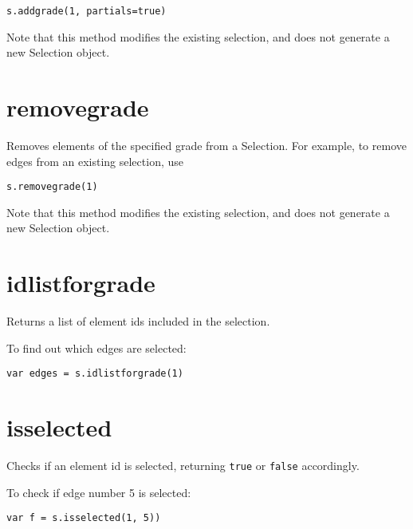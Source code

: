 \begin{lstlisting}
s.addgrade(1, partials=true)
\end{lstlisting}

Note that this method modifies the existing selection, and does not
generate a new Selection object.

\hypertarget{removegrade}{%
\section{removegrade}\label{removegrade}}

Removes elements of the specified grade from a Selection. For example,
to remove edges from an existing selection, use

\begin{lstlisting}
s.removegrade(1)
\end{lstlisting}

Note that this method modifies the existing selection, and does not
generate a new Selection object.

\hypertarget{idlistforgrade}{%
\section{idlistforgrade}\label{idlistforgrade}}

Returns a list of element ids included in the selection.

To find out which edges are selected:

\begin{lstlisting}
var edges = s.idlistforgrade(1)
\end{lstlisting}

\hypertarget{isselected}{%
\section{isselected}\label{isselected}}

Checks if an element id is selected, returning \texttt{true} or
\texttt{false} accordingly.

To check if edge number 5 is selected:

\begin{lstlisting}
var f = s.isselected(1, 5))
\end{lstlisting}
